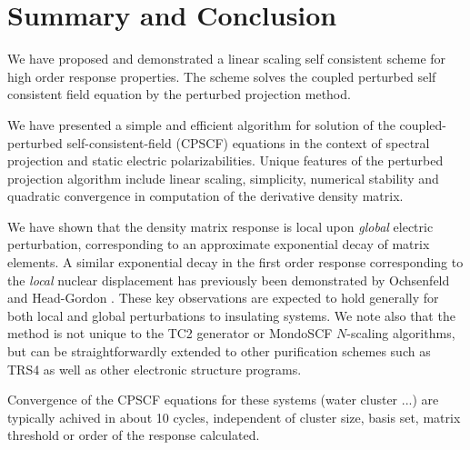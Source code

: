 \documentclass[prl,aps,twocolumn,showpacs,twocolumngrid,superbib]{revtex4}
\begin{document}
\section{Summary and Conclusion}


 We have proposed and demonstrated a linear scaling self
 consistent scheme for high order response properties.
 The scheme solves the coupled perturbed self consistent field 
 equation by the perturbed projection method.


We have presented a simple and efficient algorithm for solution 
of the coupled-perturbed self-consistent-field (CPSCF) equations 
in the context of spectral projection and static
electric polarizabilities. Unique features of the perturbed 
projection algorithm include linear scaling, simplicity, numerical 
stability and quadratic convergence in computation of the derivative
density matrix.

We have shown that the density matrix response is local 
upon {\em global} electric perturbation, corresponding to an approximate 
exponential decay of matrix elements. A similar exponential decay
in the first order response corresponding to the {\em local} nuclear 
displacement has previously been demonstrated by Ochsenfeld and 
Head-Gordon \cite{Ochsenfeld_1997}. These key observations are expected to
hold generally for both local and global perturbations to insulating systems.  
We note also that the method is not unique to the TC2 generator or 
{\sc MondoSCF} $N$-scaling algorithms, but can be straightforwardly 
extended to other purification schemes such as TRS4 \cite{ANiklasson03} as
well as other electronic structure programs.

Convergence of the CPSCF equations for these systems (water cluster ...)
are typically achived in about 10 cycles, independent of cluster size, basis set,
matrix threshold or order of the response calculated.

\end{document}
